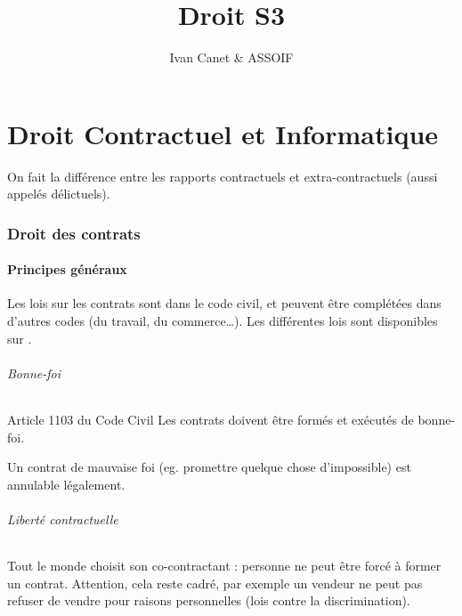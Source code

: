\documentclass[10pt,a4paper,french]{article}
\begin{document}
\title{Droit S3}
\author{Ivan Canet \& ASSOIF}
\maketitle


\tableofcontents

\part{Droit Contractuel et Informatique}

On fait la différence entre les rapports contractuels et extra-contractuels (aussi appelés délictuels).

\section{Droit des contrats}

\subsection{Principes généraux}

Les lois sur les contrats sont dans le code civil, et peuvent être complétées dans d'autres codes (du travail, du commerce\ldots). Les différentes lois sont disponibles sur .

\paragraph{Bonne-foi}

\begin{cquote}{Article 1103 du Code Civil}
Les contrats doivent être formés et exécutés de bonne-foi.
\end{cquote}

Un contrat de mauvaise foi (eg. promettre quelque chose d'impossible) est annulable légalement.

\paragraph{Liberté contractuelle}
Tout le monde choisit son co-contractant : personne ne peut être forcé à former un contrat. Attention, cela reste cadré, par exemple un vendeur ne peut pas refuser de vendre pour raisons personnelles (lois contre la discrimination).
\end{document}
